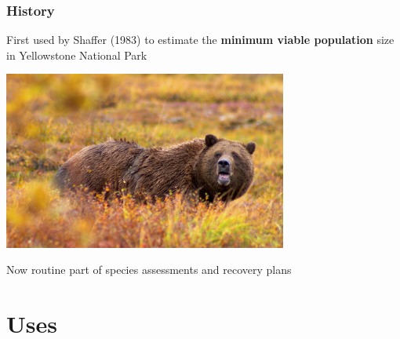 \documentclass[color=usenames,dvipsnames]{beamer}\usepackage[]{graphicx}\usepackage[]{xcolor}
\begin{document}
\begin{frame}
  \frametitle{History}
  First used by Shaffer (1983) to estimate the {\bf minimum viable
    population} size in Yellowstone National Park
  \begin{center}
    \includegraphics[width=0.7\textwidth]{figs/Grizzly_Denali}
  \end{center}
  \pause
  \centering
  Now routine part of species assessments and recovery plans \\
\end{frame}






\section{Uses}
\end{document}
